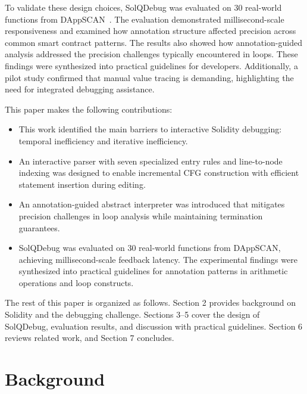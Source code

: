 \documentclass[pdflatex,sn-basic]{sn-jnl}%
\theoremstyle{thmstyleone}%
\theoremstyle{thmstyletwo}%
\theoremstyle{thmstylethree}%
\begin{document}
    To validate these design choices, SolQDebug was evaluated on 30 real-world functions from DAppSCAN~\citep{dappscan}.
    The evaluation demonstrated millisecond-scale responsiveness and examined how annotation structure
    affected precision across common smart contract patterns. The results also showed how annotation-guided analysis
    addressed the precision challenges typically encountered in loops.
    These findings were synthesized into practical guidelines for developers.
    Additionally, a pilot study confirmed that manual value tracing is demanding, highlighting the need for integrated debugging assistance.

    This paper makes the following contributions:

    \begin{itemize}
      \item This work identified the main barriers to interactive Solidity debugging: temporal inefficiency and iterative inefficiency.
      \item An interactive parser with seven specialized entry rules and line-to-node indexing was designed to enable incremental CFG construction with efficient statement insertion during editing.
      \item An annotation-guided abstract interpreter was introduced that mitigates precision challenges in loop analysis while maintaining termination guarantees.
      \item SolQDebug was evaluated on 30 real-world functions from DAppSCAN, achieving millisecond-scale feedback latency. The experimental findings were synthesized into practical guidelines for annotation patterns in arithmetic operations and loop constructs.
    \end{itemize}
\vspace{-1em}
    The rest of this paper is organized as follows.
    Section 2 provides background on Solidity and the debugging challenge.
    Sections 3--5 cover the design of SolQDebug, evaluation results, and discussion with practical guidelines.
    Section 6 reviews related work, and Section 7 concludes.

\section{Background}\label{sect2}
\end{document}
